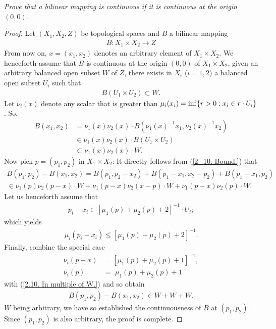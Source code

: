 \textit{%
Prove that a bilinear mapping is continuous %
if it is continuous at the origin $(0, 0)$.
}
\begin{proof}
Let $(X_1, X_2, Z)$ be topological spaces %
and $B$ a bilinear mapping %
%
  \begin{align}
    B: X_1 \times X_2 \to Z 
  \end{align}
%
From now on, $x=(x_1, x_2)$ denotes an arbitrary element of %
%
  $X_1\times X_2$. %
%
We henceforth assume that $B$ is continuous at the origin %
%
  $(0, 0)$ of $X_1\times X_2$, \ie  %
%
given an arbitrary balanced open subset $W$ of $Z$, %
there exists in $X_i$ ($i=1, 2$) a balanced open subset $U_i$ such that %
%
  \begin{align}
    B(U_1 \times U_2) \subset W .
  \end{align}
%
Let $\nu_i(x)$ denote any scalar that is greater than %
%
  $\mu_i(x_i) = \inf\{r> 0: x_i \in r \cdot U_i\}$. %
%
So, 
%
  \begin{align}
    B(x_1, x_2) 
      & = 
        \nu_1(x)\nu_2(x) 
            \cdot 
        B\left(
          \nu_1(x)^{\minus 1} x_1 , 
          \nu_2(x)^{\minus 1} x_2
        \right) \\
      & \in 
    \nu_1(x) \nu_2(x) \cdot B(U_1 \times U_2) \\
    \label{2_10. Bound.}
      & \subset 
    \nu_1(x) \nu_2(x) \cdot W.
  \end{align}
Now pick $p=(p_1, p_2)$ in $X_1\times X_2$: %
%
It directly follows from (\ref{2_10. Bound.}) that %
%
  \begin{align}
    B(p_1, p_2) - B(x_1, x_2) 
      = B(p_1, p_2 - x_2) + B(p_1 -x_1, x_2 -p_2) + B(p_1-x_1,p_2) \\
      \label{2.10. In multiple of W.}
       \in  
         \nu_1(p)\nu_2(p-x)\cdot W + 
         \nu_1(p-x)\nu_2(x-p) \cdot W  + 
         \nu_1(p-x)\nu_2(p) \cdot W.
  \end{align}
%
Let us henceforth assume that %
%
  \begin{align}
    p_i -x_i \in [\mu_1(p) + \mu_2(p) + 2]^{\minus 1} \cdot U_i;   
  \end{align}
%
which yields %
%
  \begin{align}
    \mu_i(p_i -x_i) 
      \leq 
   [\mu_1(p) + \mu_2(p) + 2]^{\minus 1}.
  \end{align}
%
Finally, combine the special case %
%
  \begin{align}
    \nu_i(p -x) & =   [\mu_1(p) + \mu_2(p) + 1]^{\minus 1}, \\ 
    \nu_i(p)    & =\,\,\mu_1(p) + \mu_2(p) + 1
  \end{align}
%
with (\ref{2.10. In multiple of W.}) and so obtain %
%
  \begin{align}
    B(p_1, p_2) - B(x_1, x_2)  \in W + W+ W.
  \end{align}
%
$W$ being arbitrary, %
we have so established the continuousness of $B$ at $(p_1, p_2)$. %
Since $(p_1, p_2)$ is also arbitrary, the proof is complete.
\end{proof}
%
